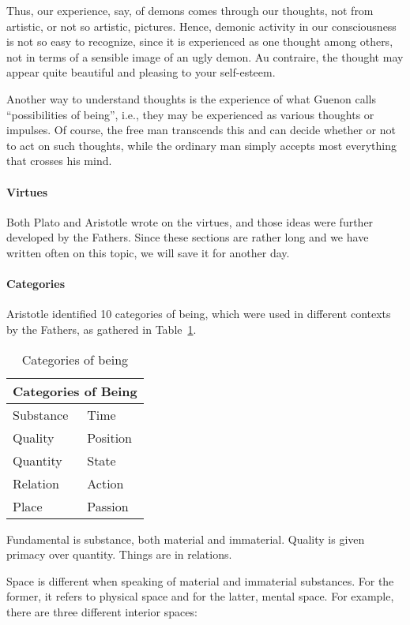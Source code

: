 Thus, our experience, say, of demons comes through our thoughts, not from artistic, or not so artistic, pictures. Hence, demonic activity in our consciousness is not so easy to recognize, since it is experienced as one thought among others, not in terms of a sensible image of an ugly demon. Au contraire, the thought may appear quite beautiful and pleasing to your self-esteem.

Another way to understand thoughts is the experience of what Guenon calls “possibilities of being”, i.e., they may be experienced as various thoughts or impulses. Of course, the free man transcends this and can decide whether or not to act on such thoughts, while the ordinary man simply accepts most everything that crosses his mind.

\paragraph{Virtues}
Both Plato and Aristotle wrote on the virtues, and those ideas were further developed by the Fathers. Since these sections are rather long and we have written often on this topic, we will save it for another day.

\paragraph{Categories}
Aristotle identified 10 categories of being, which were used in different contexts by the Fathers, as gathered in Table~\ref{tab:201506_11Esoteric Platonism2}.

\begin{table}[h]
\centering
\begin{tabular}{ll}\toprule
\multicolumn{2}{c}{\bfseries Categories of Being}\\\midrule
Substance & Time\\
Quality & Position\\
Quantity & State\\
Relation & Action\\
Place & Passion
\\\bottomrule
\end{tabular}
\caption{Categories of being}
\label{tab:201506_11Esoteric Platonism2}
\end{table}

Fundamental is substance, both material and immaterial. Quality is given primacy over quantity. Things are in relations.

Space is different when speaking of material and immaterial substances. For the former, it refers to physical space and for the latter, mental space. For example, there are three different interior spaces:

